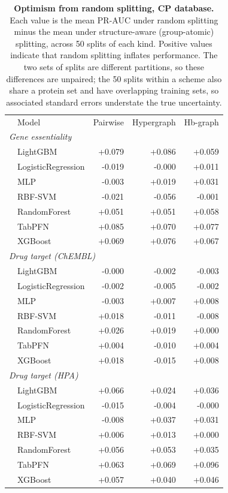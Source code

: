 \begin{table}[ht]
\centering
\small
\caption{\textbf{Optimism from random splitting, CP database.} Each
value is the mean PR-AUC under random splitting minus the mean under
structure-aware (group-atomic) splitting, across 50 splits of each kind.
Positive values indicate that random splitting inflates performance.
The two sets of splits are different partitions, so these differences
are unpaired; the 50 splits within a scheme also share a protein set and
have overlapping training sets, so associated standard errors understate
the true uncertainty.}
\label{tab:splitting-absolute}
\begin{tabular*}{\textwidth}{@{\extracolsep{\fill}}llrrr@{}}
\toprule
& Model & Pairwise & Hypergraph & Hb-graph \\
\multicolumn{5}{l}{\textit{Gene essentiality}} \\
  & LightGBM & +0.079 & +0.086 & +0.059 \\
  & LogisticRegression & -0.019 & -0.000 & +0.011 \\
  & MLP & -0.003 & +0.019 & +0.031 \\
  & RBF-SVM & -0.021 & -0.056 & -0.001 \\
  & RandomForest & +0.051 & +0.051 & +0.058 \\
  & TabPFN & +0.085 & +0.070 & +0.077 \\
  & XGBoost & +0.069 & +0.076 & +0.067 \\
\midrule
\multicolumn{5}{l}{\textit{Drug target (ChEMBL)}} \\
  & LightGBM & -0.000 & -0.002 & -0.003 \\
  & LogisticRegression & -0.002 & -0.005 & -0.002 \\
  & MLP & -0.003 & +0.007 & +0.008 \\
  & RBF-SVM & +0.018 & -0.011 & -0.008 \\
  & RandomForest & +0.026 & +0.019 & +0.000 \\
  & TabPFN & +0.004 & -0.010 & +0.004 \\
  & XGBoost & +0.018 & -0.015 & +0.008 \\
\midrule
\multicolumn{5}{l}{\textit{Drug target (HPA)}} \\
  & LightGBM & +0.066 & +0.024 & +0.036 \\
  & LogisticRegression & -0.015 & -0.004 & -0.000 \\
  & MLP & -0.008 & +0.037 & +0.031 \\
  & RBF-SVM & +0.006 & +0.013 & +0.000 \\
  & RandomForest & +0.056 & +0.053 & +0.035 \\
  & TabPFN & +0.063 & +0.069 & +0.096 \\
  & XGBoost & +0.057 & +0.040 & +0.046 \\
\bottomrule
\end{tabular*}
\end{table}

